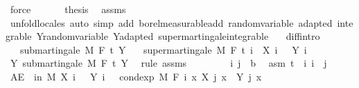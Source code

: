 \begin{isabellebody}
\ force\isanewline
\ \ \isacommand{{\isacharbraceright}{\kern0pt}}\isamarkupfalse%
\isanewline
\ \ \isamarkupfalse%
\ {\isacharquery}{\kern0pt}thesis\ \isamarkupfalse%
\ assms\ \isamarkupfalse%
\ {\isacharparenleft}{\kern0pt}unfold{\isacharunderscore}{\kern0pt}locales{\isacharparenright}{\kern0pt}\ {\isacharparenleft}{\kern0pt}auto\ simp\ add{\isacharcolon}{\kern0pt}\ borel{\isacharunderscore}{\kern0pt}measurable{\isacharunderscore}{\kern0pt}add\ random{\isacharunderscore}{\kern0pt}variable\ adapted\ integrable\ Y{\isachardot}{\kern0pt}random{\isacharunderscore}{\kern0pt}variable\ Y{\isachardot}{\kern0pt}adapted\ supermartingale{\isachardot}{\kern0pt}integrable{\isacharparenright}{\kern0pt}\ \ \isanewline
{}\isamarkupfalse%
%
\endisatagproof
{\isafoldproof}%
%
\isadelimproof
\isanewline
%
\endisadelimproof
\isanewline
{}\isamarkupfalse%
\ diff{\isacharbrackleft}{\kern0pt}intro{\isacharbrackright}{\kern0pt}{\isacharcolon}{\kern0pt}\isanewline
\ \ \ {\isachardoublequoteopen}submartingale\ M\ F\ t\ Y{\isachardoublequoteclose}\isanewline
\ \ \ {\isachardoublequoteopen}supermartingale\ M\ F\ t\ {\isacharparenleft}{\kern0pt}{\isasymlambda}i\ {\isasymxi}{\isachardot}{\kern0pt}\ X\ i\ {\isasymxi}\ {\isacharminus}{\kern0pt}\ Y\ i\ {\isasymxi}{\isacharparenright}{\kern0pt}{\isachardoublequoteclose}\isanewline
%
\isadelimproof
%
\endisadelimproof
%
\isatagproof
{}\isamarkupfalse%
\ {\isacharminus}{\kern0pt}\isanewline
\ \ \isamarkupfalse%
\ Y{\isacharcolon}{\kern0pt}\ submartingale\ M\ F\ t\ Y\ \isamarkupfalse%
\ {\isacharparenleft}{\kern0pt}rule\ assms{\isacharparenright}{\kern0pt}\isanewline
\ \ \isacommand{{\isacharbraceleft}{\kern0pt}}\isamarkupfalse%
\isanewline
\ \ \ \ \isamarkupfalse%
\ i\ j\ {\isacharcolon}{\kern0pt}{\isacharcolon}{\kern0pt}\ {\isacharprime}{\kern0pt}b\ \isamarkupfalse%
\ asm{\isacharcolon}{\kern0pt}\ {\isachardoublequoteopen}t\ {\isasymle}\ i{\isachardoublequoteclose}\ {\isachardoublequoteopen}i\ {\isasymle}\ j{\isachardoublequoteclose}\isanewline
\ \ \ \ \isamarkupfalse%
\ {\isachardoublequoteopen}AE\ {\isasymxi}\ in\ M{\isachardot}{\kern0pt}\ X\ i\ {\isasymxi}\ {\isacharminus}{\kern0pt}\ Y\ i\ {\isasymxi}\ {\isasymge}\ cond{\isacharunderscore}{\kern0pt}exp\ M\ {\isacharparenleft}{\kern0pt}F\ i{\isacharparenright}{\kern0pt}\ {\isacharparenleft}{\kern0pt}{\isasymlambda}x{\isachardot}{\kern0pt}\ X\ j\ x\ {\isacharminus}{\kern0pt}\ Y\ j\ x{\isacharparenright}{\kern0pt}\ {\isasymxi}{\isachardoublequoteclose}\ \isanewline

\end{isabellebody}
